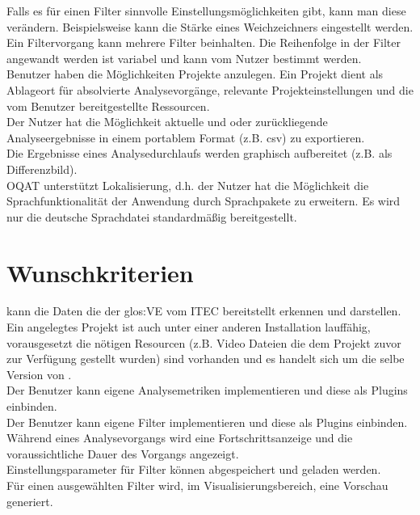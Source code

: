  Falls es für einen Filter sinnvolle Einstellungsmöglichkeiten gibt, kann man diese verändern. Beispielsweise kann die Stärke eines Weichzeichners eingestellt werden.\\
 Ein Filtervorgang kann mehrere Filter beinhalten. Die Reihenfolge in der Filter angewandt
werden ist variabel und kann vom Nutzer bestimmt werden.\\
 Benutzer haben die Möglichkeiten Projekte anzulegen. Ein Projekt dient als Ablageort für
absolvierte Analysevorgänge, relevante Projekteinstellungen und die vom Benutzer bereitgestellte Ressourcen.\\
 Der Nutzer hat die Möglichkeit aktuelle und oder zurückliegende Analyseergebnisse in einem portablem Format (z.B. \gls{csv}) zu exportieren.\\
 Die Ergebnisse eines Analysedurchlaufs werden graphisch aufbereitet (z.B. als Differenzbild).\\
 \gls{OQAT} unterstützt Lokalisierung, d.h. der Nutzer hat die Möglichkeit die Sprachfunktionalität der Anwendung durch Sprachpakete zu erweitern. Es wird nur die deutsche Sprachdatei standardmäßig bereitgestellt.
\section{Wunschkriterien}
\setcounter{counterKriterien}{0}
% 
 \projektTitel kann die Daten die der \gls{glos:VE} vom \gls{ITEC}  bereitstellt erkennen und darstellen.\\
 Ein angelegtes Projekt ist auch unter einer anderen \projektTitel Installation lauffähig, vorausgesetzt die nötigen Resourcen (z.B. Video Dateien die dem Projekt zuvor zur Verfügung gestellt wurden)  sind vorhanden und es handelt sich um die selbe Version von \projektTitel.\\
 Der Benutzer kann eigene Analysemetriken implementieren und diese als Plugins einbinden.\\
 Der Benutzer kann eigene Filter implementieren und diese als Plugins einbinden.\\
 Während eines Analysevorgangs wird eine Fortschrittsanzeige und die voraussichtliche Dauer des Vorgangs angezeigt.\\
 Einstellungsparameter für Filter können abgespeichert und geladen werden.\\
 Für einen ausgewählten Filter wird, im Visualisierungsbereich, eine Vorschau generiert.\\

